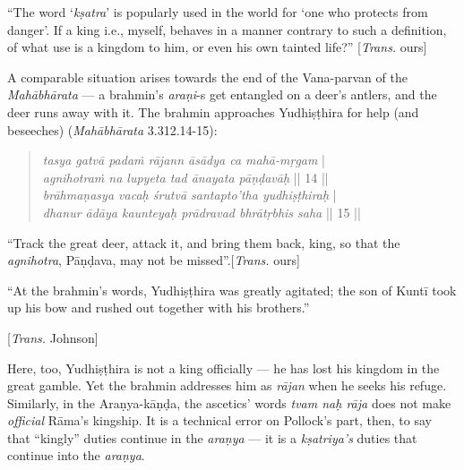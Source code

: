 \begin{myquote}
“The word ‘{\sl kṣatra}’ is popularly used in the world for ‘one who protects from danger’. If a king i.e., myself, behaves in a manner contrary to such a definition, of what use is a kingdom to him, or even his own tainted life?” 
\hfill[{\sl Trans.} ours]
\end{myquote}

A comparable situation arises towards the end of the Vana-parvan of the {\sl Mahābhārata} --- a brahmin’s {\sl araṇi}-s get entangled on a deer’s antlers, and the deer runs away with it. The brahmin approaches Yudhiṣṭhira for help (and beseeches) ({\sl Mahābhārata} 3.312.14-15): 

\newpage

\begin{quote}
{{\sl tasya gatvā padaṁ rājann āsādya ca mahā-mṛgam}} |\\
{\sl agnihotraṁ na lupyeta tad ānayata pāṇḍavāḥ} || 14 ||\\
{\sl brāhmaṇasya vacaḥ śrutvā santapto’tha yudhiṣṭhiraḥ} |\\
{\sl dhanur ādāya kaunteyaḥ prādravad bhrātṛbhis saha} || 15 ||
\end{quote}


\begin{myquote}
“Track the great deer, attack it, and bring them back, king, so that the {\sl agnihotra}, Pāṇḍava, may not be missed”.\hfill [{\sl Trans.} ours]

“At the brahmin’s words, Yudhiṣṭhira was greatly agitated; the son of Kuntī took up his bow and rushed out together with his brothers.”

\hfill [{\sl Trans.} Johnson]
\end{myquote}

Here, too, Yudhiṣṭhira is not a king officially --- he has lost his kingdom in the great gamble. Yet the brahmin addresses him as {\sl rājan} when he seeks his refuge. Similarly, in the Araṇya-kāṇḍa, the ascetics’ words {\sl tvam naḥ rāja} does not make {\sl official} Rāma’s kingship. It is a technical error on Pollock’s part, then, to say that “kingly” duties continue in the {\sl araṇya} --- it is a {\sl kṣatriya’s} duties that continue into the {\sl araṇya}.

